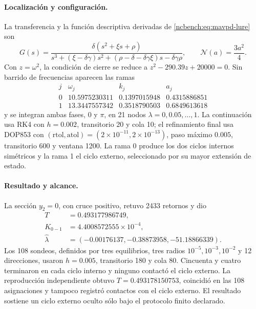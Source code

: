 \paragraph{Localización y configuración.}
La transferencia y la función descriptiva derivadas de
\eqref{ncbench:eq:mavpd-lure} son
\begin{equation}
 G(s)=\frac{\delta(s^2+\xi s+\rho)}
 {s^3+(\xi-\delta\gamma)s^2+
 (\rho-\delta-\delta\gamma\xi)s-\delta\gamma\rho},
 \qquad \mathcal N(a)=\frac{3a^2}{4}.
 \label{ncbench:eq:mavpd-transfer}
\end{equation}
Con \(z=\omega^2\), la condición de cierre se reduce a
\(z^2-290.39z+20000=0\). Sin barrido de frecuencias aparecen las ramas
\begin{equation}
 \begin{array}{c|ccc}
 j&\omega_j&k_j&a_j\\ \hline
 0&10.5975230311&0.1397015948&0.4315886851\\
 1&13.3447557342&0.3518790503&0.6849613618
 \end{array}
 \label{ncbench:eq:mavpd-periodic-branches}
\end{equation}
y se integran ambas fases, \(0\) y \(\pi\), en 21 nodos
\(\lambda=0,0.05,\ldots,1\). La continuación usa RK4 con \(h=0.002\),
transitorio 20 y cola 10; el refinamiento final usa DOP853 con
\((\mathrm{rtol},\mathrm{atol})=(2\times10^{-11},2\times10^{-13})\), paso
máximo \(0.005\), transitorio 600 y ventana 1200. La rama 0 produce los dos
ciclos internos simétricos y la rama 1 el ciclo externo, seleccionado por su
mayor extensión de estado.

\paragraph{Resultado y alcance.}
La sección \(y_2=0\), con cruce positivo, retuvo 2433 retornos y dio
\begin{equation}
 \begin{aligned}
  T&=0.493177986749,\\
  K_{0-1}&=4.4008572555\times10^{-4},\\
  \widehat\lambda&=(-0.00176137,-0.38873958,-51.18866339).
 \end{aligned}
 \label{ncbench:eq:mavpd-periodic-results}
\end{equation}
Los 108 sondeos, definidos por tres equilibrios, tres radios
\(10^{-5},10^{-3},10^{-2}\) y 12 direcciones, usaron \(h=0.005\),
transitorio 180 y cola 80. Cincuenta y cuatro terminaron en cada ciclo interno
y ninguno contactó el ciclo externo. La reproducción independiente obtuvo
\(T=0.493178150753\), coincidió en las 108 asignaciones y tampoco registró
contactos con el ciclo externo. El resultado sostiene un ciclo externo oculto
sólo bajo el protocolo finito declarado.

